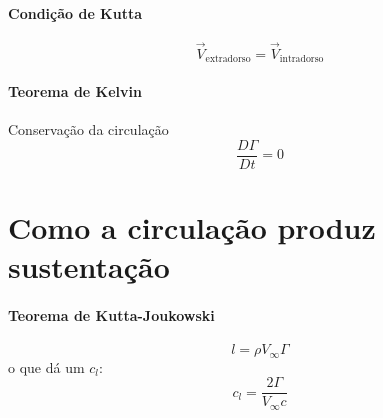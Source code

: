\documentclass{article}
\begin{document}
\paragraph{Condição de Kutta}
\begin{equation*}
	\vec{V}_{\text{extradorso}} = \vec{V}_{\text{intradorso}}
\end{equation*}

\paragraph{Teorema de Kelvin} Conservação da circulação
\begin{equation*}
	\frac{D\Gamma}{Dt} = 0
\end{equation*}

\section{Como a circulação produz sustentação}
\paragraph{Teorema de Kutta-Joukowski}
\begin{equation*}
	l = \rho V_{\infty}\Gamma
\end{equation*}
o que dá um $c_{l}$:
\begin{equation*}
	c_l=\frac{2\Gamma}{V_{\infty} c}
\end{equation*}
\end{document}
